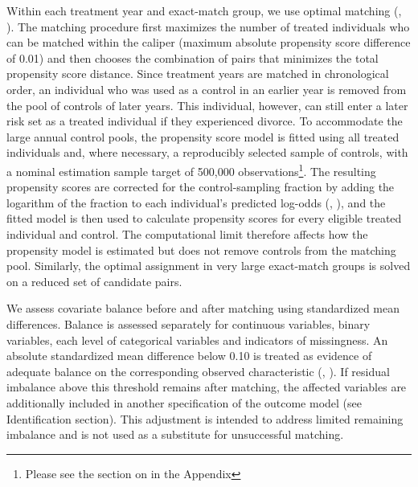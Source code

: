 \documentclass[a4paper,12pt]{article}
\theoremstyle{plain}
\theoremstyle{definition}
\theoremstyle{TheoremNum}
\theoremstyle{CorollaryNum}
\theoremstyle{PropositionNum}
\theoremstyle{TheoremNum}
\begin{document}
Within each treatment year and exact-match group, we use optimal matching (\citeauthor{rosenbaum1989optimal}, \citeyear{rosenbaum1989optimal}). The matching procedure first maximizes the number of treated individuals who can be matched within the caliper (maximum absolute propensity score difference of 0.01) and then chooses the combination of pairs that minimizes the total propensity score distance. Since treatment years are matched in chronological order, an individual who was used as a control in an earlier year is removed from the pool of controls of later years. This individual, however, can still enter a later risk set as a treated individual if they experienced divorce. To accommodate the large annual control pools, the propensity score model is fitted using all treated individuals and, where necessary, a reproducibly selected sample of controls, with a nominal estimation sample target of 500,000 observations\footnote{Please see the section on  in the Appendix}. The resulting propensity scores are corrected for the control-sampling fraction by adding the logarithm of the fraction to each individual's predicted log-odds (\citeauthor{king2001logistic}, \citeyear{king2001logistic}), and the fitted model is then used to calculate propensity scores for every eligible treated individual and control. The computational limit therefore affects how the propensity model is estimated but does not remove controls from the matching pool. Similarly, the optimal assignment in very large exact-match groups is solved on a reduced set of candidate pairs. 

We assess covariate balance before and after matching using standardized mean differences. Balance is assessed separately for continuous variables, binary variables, each level of categorical variables and indicators of missingness. An absolute standardized mean difference below 0.10 is treated as evidence of adequate balance on the corresponding observed characteristic (\citeauthor{austin2009balance}, \citeyear{austin2009balance}). If residual imbalance above this threshold remains after matching, the affected variables are additionally included in another specification of the outcome model (see Identification section). This adjustment is intended to address limited remaining imbalance and is not used as a substitute for unsuccessful matching.
\end{document}
